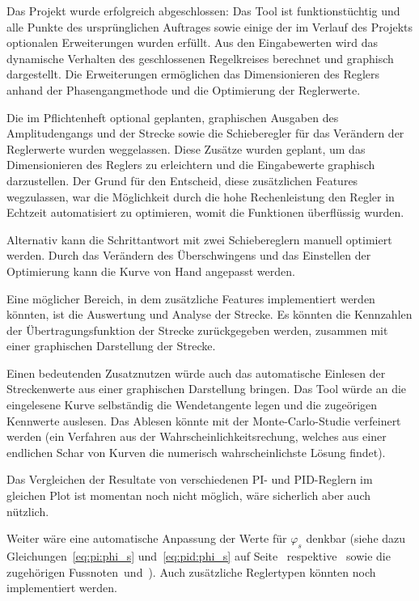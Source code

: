 Das Projekt  wurde erfolgreich abgeschlossen: Das Tool  ist funktionst\"uchtig
und alle Punkte des urspr\"unglichen Auftrages sowie einige der im Verlauf des
Projekts  optionalen  Erweiterungen  wurden erf\"ullt. Aus  den  Eingabewerten
wird  das dynamische  Verhalten des  geschlossenen Regelkreises  berechnet und
graphisch dargestellt. Die Erweiterungen  erm\"oglichen das Dimensionieren des
Reglers anhand der Phasengangmethode und die Optimierung der Reglerwerte.


Die   im   Pflichtenheft   optional  geplanten,   graphischen   Ausgaben   des
Amplitudengangs und der Strecke sowie  die Schieberegler f\"ur das Ver\"andern
der  Reglerwerte wurden  weggelassen. Diese Zus\"atze  wurden geplant,  um das
Dimensionieren  des  Reglers zu  erleichtern  und  die Eingabewerte  graphisch
darzustellen. Der  Grund f\"ur  den Entscheid,  diese zus\"atzlichen  Features
wegzulassen, war die M\"oglichkeit durch die hohe Rechenleistung den Regler in
Echtzeit  automatisiert zu  optimieren, womit  die Funktionen  \"uberfl\"ussig
wurden.


Alternativ kann  die Schrittantwort mit zwei  Schiebereglern manuell optimiert
werden. Durch  das Ver\"andern  des  \"Uberschwingens und  das Einstellen  der
Optimierung kann die Kurve von  Hand angepasst werden.


Eine m\"oglicher  Bereich, in dem zus\"atzliche  Features implementiert werden
k\"onnten,  ist  die Auswertung  und  Analyse  der Strecke. Es  k\"onnten  die
Kennzahlen  der  \"Ubertragungsfunktion  der Strecke  zur\"uckgegeben  werden,
zusammen mit einer graphischen Darstellung der Strecke.


Einen  bedeutenden   Zusatznutzen  w\"urde  auch  das   automatische  Einlesen
der  Streckenwerte   aus  einer  graphischen  Darstellung   bringen. Das  Tool
w\"urde   an   die   eingelesene   Kurve   selbst\"andig   die   Wendetangente
legen   und  die   zuge\"origen  Kennwerte   auslesen. Das  Ablesen   k\"onnte
mit  der   Monte-Carlo-Studie  verfeinert   werden  (ein  Verfahren   aus  der
Wahrscheinlichkeitsrechung, welches  aus einer endlichen Schar  von Kurven die
numerisch wahrscheinlichste L\"osung findet).


Das  Vergleichen  der  Resultate  von verschiedenen  PI-  und  PID-Reglern  im
gleichen Plot ist  momentan noch nicht m\"oglich, w\"are  sicherlich aber auch
n\"utzlich.


Weiter  w\"are  eine  automatische   Anpassung  der  Werte  f\"ur  $\varphi_s$
denkbar   (siehe  dazu   Gleichungen~\ref{eq:pi:phi_s}  und~\ref{eq:pid:phi_s}
auf   Seite~\pageref{eq:pi:phi_s}    respektive~\pageref{eq:pid:phi_s}   sowie
die   zugeh\"origen   Fussnoten~\footnotemark[4]   und~\footnotemark[7]). Auch
zus\"atzliche Reglertypen k\"onnten noch implementiert werden.
